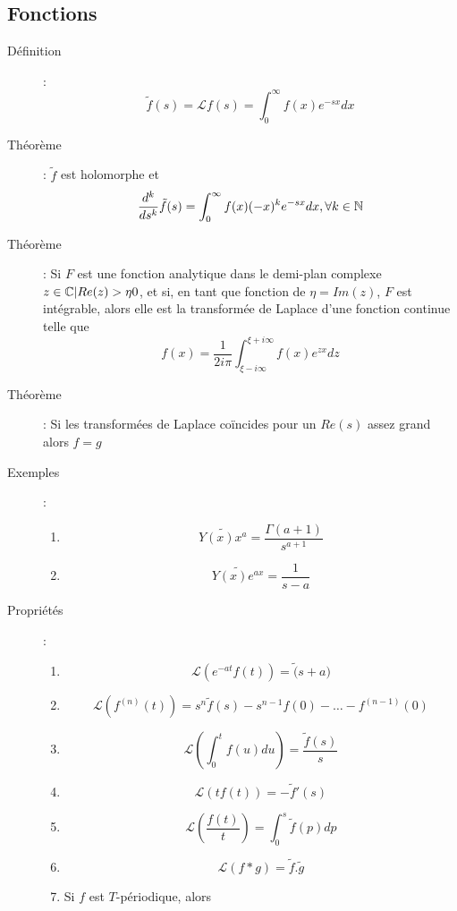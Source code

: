 \subsection{Fonctions}
\begin{description}
\item[Définition] :
    \[
        \tilde f(s)=\mathcal Lf(s)=\int_0^\infty f(x)e^{-sx}dx
    \]
\item[Théorème] : $\tilde f$ est holomorphe et
    \[
        \frac{d^k}{ds^k}\tilde f(s)=
        \int_0^\infty f(x)(-x)^ke^{-sx}dx, \forall k\in\mathbb{N}
    \]
\item[Théorème] : Si $F$ est une fonction analytique dans le demi-plan complexe ${z\in\mathbb{C} | Re(z) > \eta 0 }$, et si, en tant
    que fonction de $\eta = Im(z)$, $F$ est intégrable, alors elle est la transformée de Laplace d’une fonction continue
    telle que
    \[
        f(x)=\frac{1}{2i\pi}\int_{\xi-i\infty}^{\xi+i\infty}f(x)e^{zx}dz
    \]
\item[Théorème] : Si les transformées de Laplace coïncides pour un $Re(s)$ assez grand alors $f = g$
\item[Exemples] :
\begin{multicols}{2}
    \begin{enumerate}
        \item\[
            \widetilde{Y(x)x^a}=\frac{\Gamma(a+1)}{s^{a+1}}
        \]
        \item\[
            \widetilde{Y(x)e^{ax}}=\frac{1}{s-a}
        \]
    \end{enumerate}
\end{multicols}
\item[Propriétés] :
\begin{multicols}{2}
    \begin{enumerate}
        \item\[
            \mathcal L(e^{-at}f(t))=\tilde(s+a)
        \]
        \item\[
            \mathcal L(f^{(n)}(t))=s^n\tilde f(s)-s^{n-1}f(0)-\dots-f^{(n-1)}(0)
        \]
        \item\[
            \mathcal L\left(\int_0^tf(u)du\right)=\frac{\tilde f(s)}{s}
        \]
        \item\[
            \mathcal L(tf(t))=-\tilde f'(s)
        \]
        \item\[
            \mathcal L\left(\frac{f(t)}{t}\right)=\int_0^s\tilde f(p)dp
        \]
        \item\[
            \mathcal L(f*g)=\tilde f.\tilde g
        \]
        \item Si $f$ est $T$-périodique, alors\[
\]
\end{enumerate}
\end{multicols}
\end{description}
